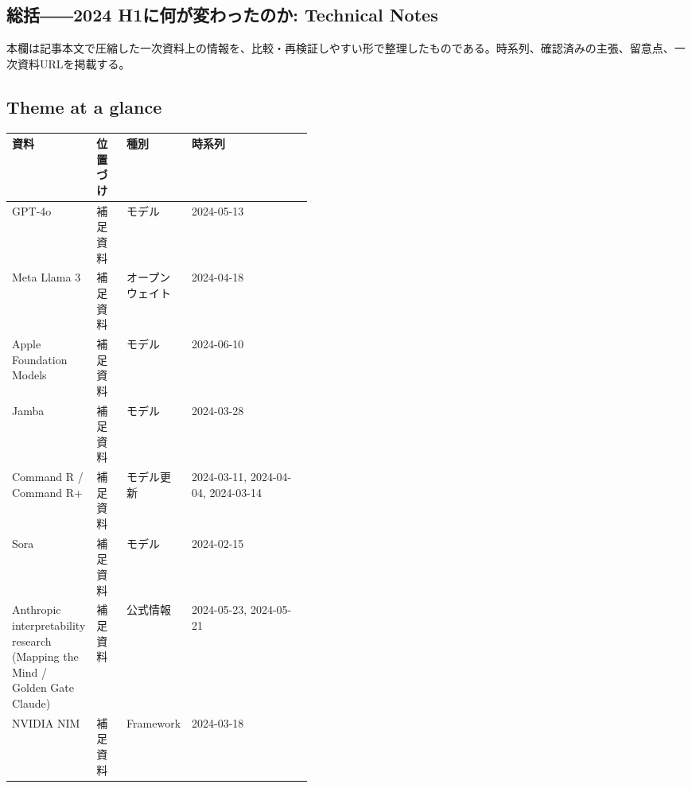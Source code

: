\subsection*{総括――2024 H1に何が変わったのか: Technical Notes}
本欄は記事本文で圧縮した一次資料上の情報を、比較・再検証しやすい形で整理したものである。時系列、確認済みの主張、留意点、一次資料URLを掲載する。
\smallskip
{}\par
\medskip
\subsection*{Theme at a glance}
\begin{center}
\footnotesize
\begin{tabularx}{\linewidth}{@{}p{0.20\linewidth}p{0.10\linewidth}p{0.14\linewidth}X@{}}
\toprule
資料 & 位置づけ & 種別 & 時系列 \\
\midrule
GPT-4o & 補足資料 & モデル & 2024-05-13     \\
Meta Llama 3 & 補足資料 & オープンウェイト & 2024-04-18     \\
Apple Foundation Models & 補足資料 & モデル & 2024-06-10     \\
Jamba & 補足資料 & モデル & 2024-03-28     \\
Command R / Command R+ & 補足資料 & モデル更新 & 2024-03-11, 2024-04-04, 2024-03-14     \\
Sora & 補足資料 & モデル & 2024-02-15     \\
Anthropic interpretability research (Mapping the Mind / Golden Gate Claude) & 補足資料 & 公式情報 & 2024-05-23, 2024-05-21     \\
NVIDIA NIM & 補足資料 & Framework & 2024-03-18     \\
\bottomrule
\end{tabularx}
\end{center}
\normalsize

